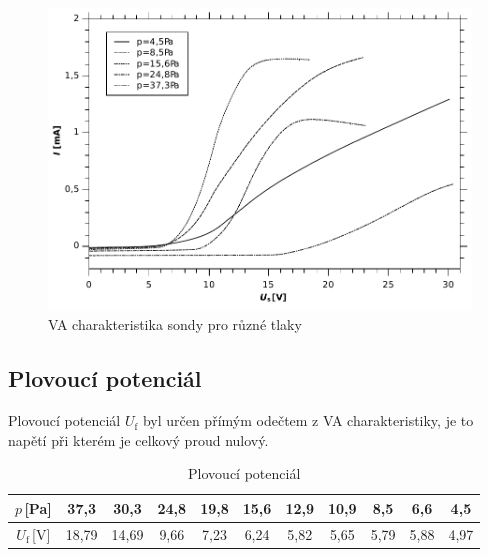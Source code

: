 \documentclass[12pt]{article}
\begin{document}
\begin{figure}[htbp]
\begin{center}
\includegraphics[width=12.8cm]{img/prubeh.pdf}
\caption{VA charakteristika sondy pro různé tlaky}
\label{VA}
\end{center}
\end{figure}

\subsection{Plovoucí potenciál}
Plovoucí potenciál $U_\mathrm{f}$ byl určen přímým odečtem z VA charakteristiky, je to napětí při kterém je celkový proud nulový.

\begin{table}[htbp]
\begin{center}
\begin{tabular}{|c|c|c|c|c|c|c|c|c|c|c|}
\hline
$p$\,[Pa] & 37,3 & 30,3 & 24,8 & 19,8 & 15,6 & 12,9 & 10,9 & 8,5 & 6,6 & 4,5 \\ \hline
$U_\mathrm{f}$\,[V] & 18,79 & 14,69 & 9,66 & 7,23 & 6,24 & 5,82 & 5,65 & 5,79 & 5,88 & 4,97
 \\ \hline
\end{tabular}
\caption{Plovoucí potenciál}
\label{}
\end{center}
\end{table}
\end{document}
